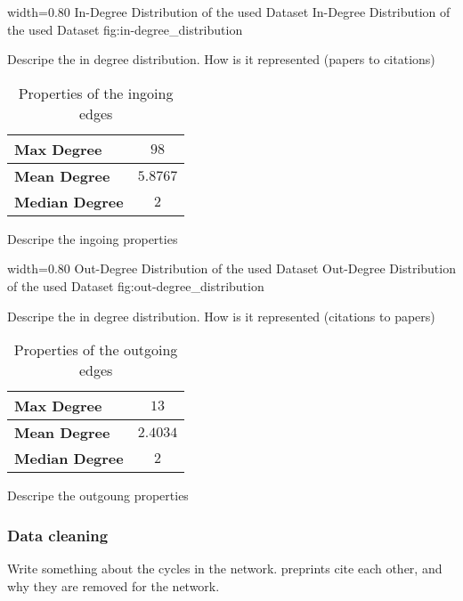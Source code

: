       {width=0.80\textwidth}
      {In-Degree Distribution of the used Dataset}
      {In-Degree Distribution of the used Dataset}
      {fig:in-degree_distribution}

Descripe the in degree distribution. How is it represented (papers to citations)

\begin{table}
  \centering
  \begin{tabular}{ l c }
    \toprule
    \textbf{Max Degree}    & $98$     \\ \midrule
    \textbf{Mean Degree}   & $5.8767$ \\ \midrule
    \textbf{Median Degree} & $2$      \\
    \bottomrule
  \end{tabular}
  \caption[Properties of the ingoing edges in the used dataset]{Properties of the ingoing edges}
  \label{tbl:properties_ingoing_edges}
\end{table}

Descripe the ingoing properties

      {width=0.80\textwidth}
      {Out-Degree Distribution of the used Dataset}
      {Out-Degree Distribution of the used Dataset}
      {fig:out-degree_distribution}

Descripe the in degree distribution. How is it represented (citations to papers)

\begin{table}
  \centering
  \begin{tabular}{ l c }
    \toprule
    \textbf{Max Degree}    & $13$     \\ \midrule
    \textbf{Mean Degree}   & $2.4034$ \\ \midrule
    \textbf{Median Degree} & $2$      \\
    \bottomrule
  \end{tabular}
  \caption[Properties of the outgoing edges in the used dataset]{Properties of the outgoing edges}
  \label{tbl:properties_outgoing_edges}
\end{table}

Descripe the outgoung properties

\subsubsection{Data cleaning}
\label{subsubsec:data_cleaning}
Write something about the cycles in the network. preprints cite each other, and why they are removed for the network.

